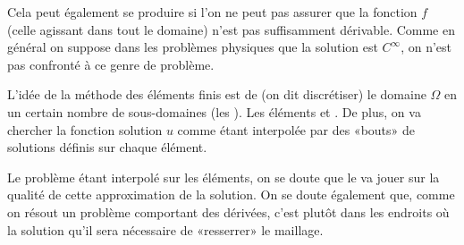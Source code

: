 Cela peut également se produire si l'on ne peut pas assurer que la fonction $f$
(celle agissant dans tout le domaine) n'est pas suffisamment dérivable.
Comme en général on suppose dans les problèmes physiques que la solution est $C^\infty$,
on n'est pas confronté à ce genre de problème.

\medskip
L'idée de la méthode des éléments finis est de  (on dit discrétiser) le domaine $\Omega$
en un certain nombre de sous-domaines (les ).
Les éléments 
et 
.
De plus, on va chercher la fonction solution $u$ comme étant interpolée par des «bouts»
de solutions définis sur chaque élément.

\medskip
Le problème étant interpolé sur les éléments, on se doute que le
 va jouer sur la qualité de cette approximation de la solution.
On se doute également que, comme on résout un problème comportant des
dérivées, c'est plutôt dans les endroits où la solution  qu'il
sera nécessaire de «resserrer» le maillage.

